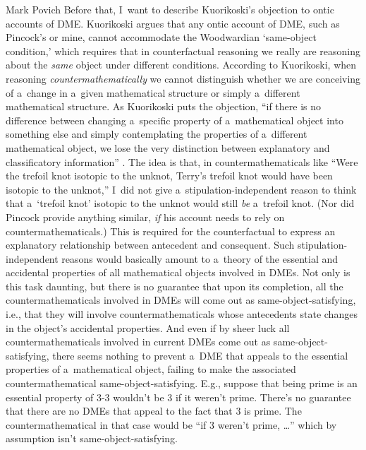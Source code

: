 \begin{artengenv}{Mark Povich}
Before that, I~want to describe Kuorikoski's
\parencite*[][]{priest_note_2021} %
 objection to ontic accounts of DME. Kuorikoski argues that any ontic account of DME, such as Pincock's or mine, cannot accommodate the Woodwardian ‘same-object condition,' which requires that in counterfactual reasoning we really are reasoning about the \textit{same} object under different conditions. According to Kuorikoski, when reasoning \textit{countermathematically} we cannot distinguish whether we are conceiving of a~change in a~given mathematical structure or simply a~different mathematical structure. As Kuorikoski puts the objection, ``if there is no difference between changing a~specific property of a~mathematical object into something else and simply contemplating the properties of a~different mathematical object, we lose the very distinction between explanatory and classificatory information'' 
\parencite[][p.197]{kuorikoski_there_2021}. %
 The idea is that, in countermathematicals like ``Were the trefoil knot isotopic to the unknot, Terry's trefoil knot would have been isotopic to the unknot,'' I~did not give a~stipulation-independent reason to think that a~‘trefoil knot' isotopic to the unknot would still \textit{be} a~trefoil knot. (Nor did Pincock provide anything similar, \textit{if} his account needs to rely on countermathematicals.) This is required for the counterfactual to express an explanatory relationship between antecedent and consequent. Such stipulation-independent reasons would basically amount to a~theory of the essential and accidental properties of all mathematical objects involved in DMEs. Not only is this task daunting, but there is no guarantee that upon its completion, all the countermathematicals involved in DMEs will come out as same-object-satisfying, i.e., that they will involve countermathematicals whose antecedents state changes in the object's accidental properties. And even if by sheer luck all countermathematicals involved in current DMEs come out as same-object-satisfying, there seems nothing to prevent a~DME that appeals to the essential properties of a~mathematical object, failing to make the associated countermathematical same-object-satisfying. E.g., suppose that being prime is an essential property of 3-3 wouldn't be 3 if it weren't prime. There's no guarantee that there are no DMEs that appeal to the fact that 3 is prime. The countermathematical in that case would be ``if 3 weren't prime, …'' which by assumption isn't same-object-satisfying.


\end{artengenv}
